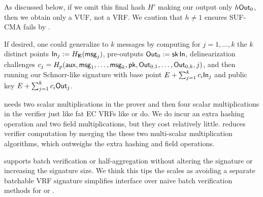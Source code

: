 As discussed below, if we omit this final hash $H'$ making
our output only $h {\mathsf{Out}}_0$, then we obtain only a VUF, not a VRF.
We caution that $h \ne 1$ ensures SUF-CMA fails
 by \cite[\S4.1.2]{cryptoeprint:2020:823}.

If desired, one could generalize \ThinVRF to $k$ messages by
computing for $j=1,\ldots,k$ the $k$ distinct
points ${\mathsf{In}}_j := H_{{\mathbf{E}}}(\mathsf{msg}_j)$, pre-outputs ${\mathsf{Out}}_0 := \mathsf{sk} \, {\mathsf{In}}$,
delinearization challenges
 $c_j = H_p(\mathsf{aux},\mathsf{msg}_1,\ldots,\mathsf{msg}_k,\mathsf{pk},{\mathsf{Out}}_{0,1},\ldots,{\mathsf{Out}}_{0,k},j)$,
and then running our Schnorr-like signature with
 base point $E + \sum_{j=1}^k c_i {\mathsf{In}}_j$ and
 public key $E + \sum_{j=1}^k c_i {\mathsf{Out}}_j$.

\smallskip

\ThinVRF needs two scalar multiplications in the prover and
then four scalar multiplications in the verifier
just like fat EC VRFs like \cite{nsec5} or \cite{VXEd25519} do.
We do incur an extra hashing operation and two field multiplications,
but they cost relatively little.
\ThinVRF reduces verifier computation by merging the these two
multi-scalar multiplication algorithms, which outweighs the extra hashing and field operations.

\ThinVRF supports batch verification or half-aggregation \cite{???}
without altering the signature or increasing the signature size.
We think this tips the scales as avoiding a separate batchable VRF
signature simplifies interface over naive batch verification methods
for \cite{nsec5} or \cite{VXEd25519}.


\endinput 













%

